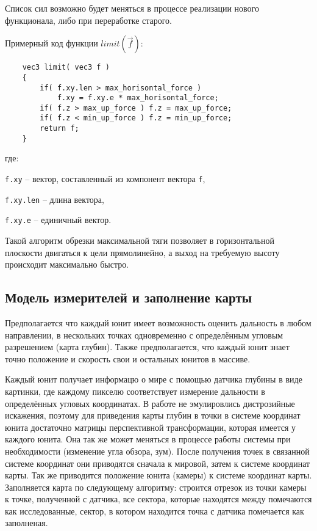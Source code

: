 Список сил возможно будет меняться в процессе реализации нового функционала, либо при переработке старого.

\newpage
Примерный код функции $limit \left( \vec f \right)$:

\begin{verbatim}
    vec3 limit( vec3 f )
    {
        if( f.xy.len > max_horisontal_force )
            f.xy = f.xy.e * max_horisontal_force;
        if( f.z > max_up_force ) f.z = max_up_force;
        if( f.z < min_up_force ) f.z = min_up_force;
        return f;
    }
\end{verbatim}

где:

\verb|f.xy| -- вектор, составленный из компонент вектора \verb|f|,

\verb|f.xy.len| -- длина вектора,

\verb|f.xy.e| -- единичный вектор.

Такой алгоритм обрезки максимальной тяги позволяет в горизонтальной плоскости двигаться к цели прямолинейно,
а выход на требуемую высоту происходит максимально быстро.

\subsection{Модель измерителей и заполнение карты}

Предполагается что каждый юнит имеет возможность
оценить дальность в любом направлении, в нескольких точках одновременно с определённым 
угловым разрешением (карта глубин). Также предполагается, что каждый юнит знает точно положение и скорость
свои и остальных юнитов в массиве.

Каждый юнит получает информацю о мире с помощью датчика глубины в виде картинки,
где каждому пикселю соответствует измерение дальности в определённых угловых координатах. В работе не эмулировлись
дистрозийные искажения, поэтому для приведения карты глубин в точки в системе координат юнита достаточно 
матрицы перспективной трансформации, которая имеется у каждого юнита. Она так же может меняться в процессе работы
системы при необходимости (изменение угла обзора, зум). После получения точек в связанной системе координат они приводятся
сначала к мировой, затем к системе координат карты. Так же приводится положение юнита (камеры) к системе координат карты.
Заполняется карта по следующему алгоритму: строится отрезок из точки камеры к точке, полученной с датчика, все сектора, которые
находятся между помечаются как исследованные, сектор, в котором находится точка с датчика помечается как заполненая.

